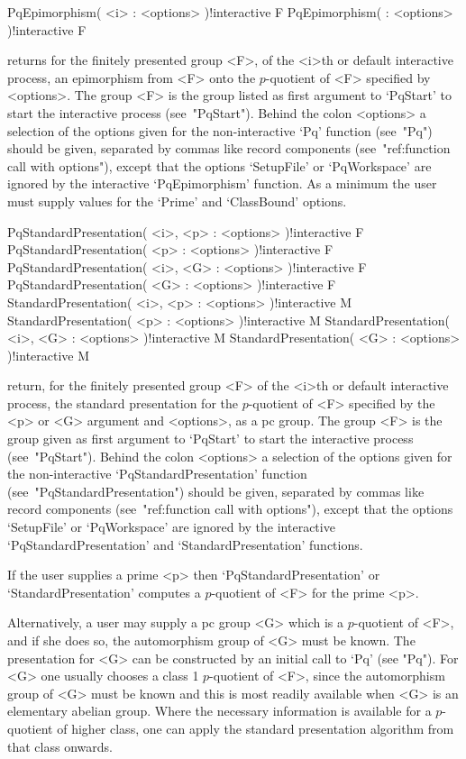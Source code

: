 \>PqEpimorphism( <i> : <options> )!{interactive} F
\>PqEpimorphism( : <options> )!{interactive} F

returns for the finitely presented group <F>, of  the  <i>th  or  default
interactive  {\ANUPQ}  process,  an  epimorphism  from   <F>   onto   the
$p$-quotient of <F> specified by <options>. The group <F>  is  the  group
listed as first argument to `PqStart' to start the  interactive  {\ANUPQ}
process (see~"PqStart"). Behind the colon <options> a  selection  of  the
options given for the non-interactive `Pq' function (see~"Pq") should  be
given, separated by commas like record components (see~"ref:function call
with options"), except that the options `SetupFile' or `PqWorkspace'  are
ignored by the interactive `PqEpimorphism' function.  As  a  minimum  the
user must supply values for the `Prime' and `ClassBound' options.

\>PqStandardPresentation( <i>, <p> : <options> )!{interactive} F
\>PqStandardPresentation( <p> : <options> )!{interactive} F
\>PqStandardPresentation( <i>, <G> : <options> )!{interactive} F
\>PqStandardPresentation( <G> : <options> )!{interactive} F
\>StandardPresentation( <i>, <p> : <options> )!{interactive} M
\>StandardPresentation( <p> : <options> )!{interactive} M
\>StandardPresentation( <i>, <G> : <options> )!{interactive} M
\>StandardPresentation( <G> : <options> )!{interactive} M

return, for the finitely presented group <F>  of  the  <i>th  or  default
interactive  {\ANUPQ}  process,  the  standard   presentation   for   the
$p$-quotient of <F> specified by the <p> or <G> argument  and  <options>,
as a pc group. The group <F> is the group  given  as  first  argument  to
`PqStart' to start  the  interactive  {\ANUPQ}  process  (see~"PqStart").
Behind the colon <options> a selection  of  the  options  given  for  the
non-interactive             `PqStandardPresentation'             function
(see~"PqStandardPresentation") should be given, separated by commas  like
record components (see~"ref:function call with options"), except that the
options `SetupFile' or  `PqWorkspace'  are  ignored  by  the  interactive
`PqStandardPresentation' and `StandardPresentation' functions.

If the  user  supplies  a  prime  <p>  then  `PqStandardPresentation'  or
`StandardPresentation' computes a $p$-quotient of <F> for the prime <p>.

Alternatively, a user may supply a pc group <G> which is  a  $p$-quotient
of <F>, and if she does so, the automorphism group of <G> must be  known.
The presentation for <G> can be constructed by an initial  call  to  `Pq'
(see "Pq"). For <G> one usually chooses a class 1  $p$-quotient  of  <F>,
since the automorphism group of <G>  must  be  known  and  this  is  most
readily available when <G> is an  elementary  abelian  group.  Where  the
necessary information is available for a $p$-quotient  of  higher  class,
one can  apply  the  standard  presentation  algorithm  from  that  class
onwards.

